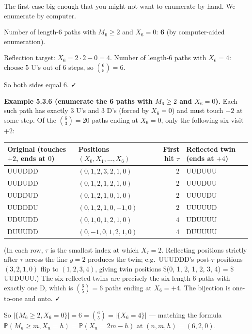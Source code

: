 \documentclass[
  10pt,
  twoside]{book}
\newcounter{none} %
\begin{document}
The first case big enough that you might not want to enumerate by hand.
We enumerate by computer.

Number of length-6 paths with \(M_6 \ge 2\) and \(X_6 = 0\): \textbf{6}
(by computer-aided enumeration).

Reflection target: \(X_6 = 2 \cdot 2 - 0 = 4\). Number of length-6 paths
with \(X_6 = 4\): choose 5 U's out of 6 steps, so \(\binom{6}{5} = 6\).

So both sides equal 6. ✓

\textbf{Example 5.3.6 (enumerate the 6 paths with \(M_6 \ge 2\) and
\(X_6 = 0\)).} Each such path has exactly 3 U's and 3 D's (forced by
\(X_6 = 0\)) and must touch \(+2\) at some step. Of the
\(\binom{6}{3} = 20\) paths ending at \(X_6 = 0\), only the following
six visit \(+2\):

{\def\LTcaptype{none} %
\begin{table}[H]
\centering
\begin{tabular}{|l|l|r|l|}
\toprule
Original (touches \(+2\), ends at \(0\)) & Positions \((X_0, X_1, \ldots, X_6)\) & First hit \(\tau\) & Reflected twin (ends at \(+4\)) \\
\midrule



UUUDDD & \((0, 1, 2, 3, 2, 1, 0)\) & \(2\) & UUDUUU \\
UUDUDD & \((0, 1, 2, 1, 2, 1, 0)\) & \(2\) & UUUDUU \\
UUDDUD & \((0, 1, 2, 1, 0, 1, 0)\) & \(2\) & UUUUDU \\
UUDDDU & \((0, 1, 2, 1, 0, -1, 0)\) & \(2\) & UUUUUD \\
UDUUDD & \((0, 1, 0, 1, 2, 1, 0)\) & \(4\) & UDUUUU \\
DUUUDD & \((0, -1, 0, 1, 2, 1, 0)\) & \(4\) & DUUUUU \\
\bottomrule
\end{tabular}
\end{table}
}

(In each row, \(\tau\) is the smallest index at which \(X_\tau = 2\).
Reflecting positions strictly after \(\tau\) across the line \(y = 2\)
produces the twin; e.g.~UUUDDD's post-\(\tau\) positions
\((3, 2, 1, 0)\) flip to \((1, 2, 3, 4)\), giving twin positions \$(0,
1, 2, 1, 2, 3, 4) = \$ UUDUUU.) The six reflected twins are precisely
the six length-6 paths with exactly one D, which is \(\binom{6}{5} = 6\)
paths ending at \(X_6 = +4\). The bijection is one-to-one and onto. ✓

So \(|\{M_6 \ge 2, X_6 = 0\}| = 6 = \binom{6}{5} = |\{X_6 = 4\}|\) ---
matching the formula
\(\mathbb P(M_n \ge m, X_n = h) = \mathbb P(X_n = 2m - h)\) at
\((n, m, h) = (6, 2, 0)\).
\end{document}
